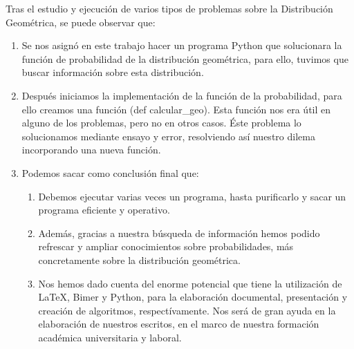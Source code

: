Tras el estudio y ejecuci\'on de varios tipos de problemas sobre la Distribuci\'on Geom\'etrica, se puede observar que:\\
\begin{enumerate}
	 \item Se nos asign\'o en este trabajo  hacer un programa Python que solucionara la funci\'on de probabilidad de la distribuci\'on geom\'etrica, para ello, tuvimos que buscar informaci\'on sobre esta distribuci\'on.

\item Despu\'es iniciamos la implementaci\'on de la funci\'on de la probabilidad, para ello creamos una funci\'on (def calcular\_geo). 
   Esta funci\'on nos era \'util en alguno de los problemas, pero no en otros casos. \'Este problema lo solucionamos mediante ensayo y error, resolviendo as\'i nuestro dilema incorporando una nueva funci\'on.
  \item Podemos sacar como conclusi\'on final que:
   \begin{enumerate}
   	 \item Debemos ejecutar varias veces un programa, hasta purificarlo y sacar un programa eficiente y operativo. 

     \item Adem\'as, gracias a nuestra b\'usqueda de informaci\'on hemos podido refrescar y ampliar conocimientos sobre probabilidades, m\'as concretamente sobre la distribuci\'on geom\'etrica.
     \item Nos hemos dado cuenta del enorme potencial que tiene la utilizaci\'on de \LaTeX, Bimer y Python, para la elaboraci\'on documental, presentaci\'on y creaci\'on de algoritmos, respect\'ivamente. Nos ser\'a de gran ayuda en la elaboraci\'on de nuestros escritos, en el marco de nuestra formaci\'on acad\'emica universitaria y laboral.
   \end{enumerate}
   
\end{enumerate}




